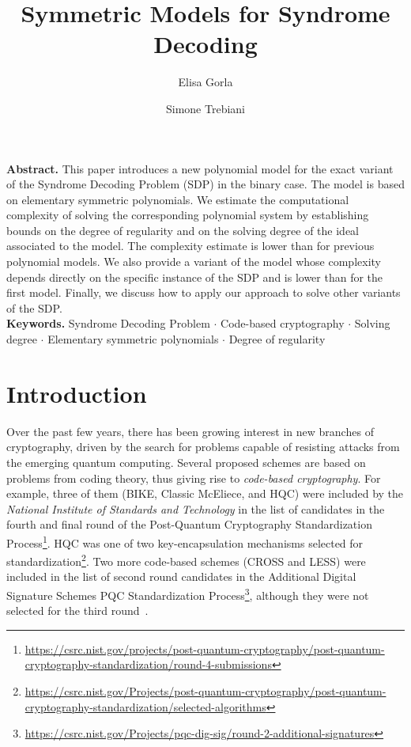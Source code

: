 \documentclass[11pt]{article}
\title{Symmetric Models for Syndrome Decoding}
\author[1]{Elisa Gorla}
\author[1]{Simone Trebiani}
\date{}
\affil[1]{Institut de mathématiques, Université de Neuchâtel}
\theoremstyle{plain}
\theoremstyle{definition}
\theoremstyle{remark}
\begin{document}
\maketitle

\noindent\textbf{Abstract.} This paper introduces a new polynomial model for the exact variant of the Syndrome Decoding Problem (SDP) in the binary case. The model is based on elementary symmetric polynomials. We estimate the computational complexity of solving the corresponding polynomial system by establishing bounds on the degree of regularity and on the solving degree of the ideal associated to the model. The complexity estimate is lower than for previous polynomial models.
We also provide a variant of the model whose complexity depends directly on the specific instance of the SDP and is lower than for the first model. Finally, we discuss how to apply our approach to solve other variants of the SDP.\\

\noindent\textbf{Keywords.} Syndrome Decoding Problem $\cdot$ Code-based cryptography $\cdot$ Solving degree $\cdot$ Elementary symmetric polynomials $\cdot$ Degree of regularity

\section*{Introduction}

Over the past few years, there has been growing interest in new branches of cryptography, driven by the search for problems capable of resisting attacks from the emerging quantum computing. Several proposed schemes are based on problems from coding theory, thus giving rise to \textit{code-based cryptography}. For example, three of them (BIKE, Classic McEliece, and HQC) were included by the \textit{National Institute of Standards and Technology} in the list of candidates in the fourth and final round of the Post-Quantum Cryptography Standardization Process\footnote{\url{https://csrc.nist.gov/projects/post-quantum-cryptography/post-quantum-cryptography-standardization/round-4-submissions}}. HQC was one of two key-encapsulation mechanisms selected for standardization\footnote{\url{https://csrc.nist.gov/Projects/post-quantum-cryptography/post-quantum-cryptography-standardization/selected-algorithms}}. Two more code-based schemes (CROSS and LESS) were included in the list of second round candidates in the Additional Digital Signature Schemes PQC Standardization Process\footnote{\url{https://csrc.nist.gov/Projects/pqc-dig-sig/round-2-additional-signatures}}, although they were not selected for the third round~\cite{NISTIR8610}. 
\end{document}
